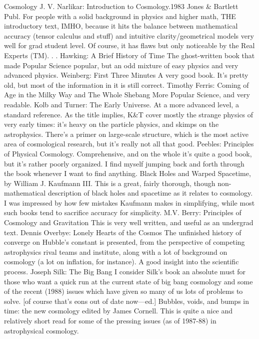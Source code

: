 \documentclass[10pt,a4paper]{book}
\theoremstyle{definition}
\begin{document}
Cosmology
J. V. Narlikar: Introduction to Cosmology.1983 Jones \& Bartlett Publ.
For people with a solid background in physics and higher math, THE introductory text, IMHO, because it hits the balance between mathematical accuracy (tensor calculus and stuff) and intuitive clarity/geometrical models very well for grad student level.  Of course, it has flaws but only noticeable by the Real Experts (TM). . .
Hawking: A Brief History of Time
The ghost-written book that made Popular Science popular, but an odd mixture of easy physics and very advanced physics.
Weinberg: First Three Minutes
A very good book.  It's pretty old, but most of the information in it is still correct.
Timothy Ferris: Coming of Age in the Milky Way and The Whole Shebang
More Popular Science, and very readable.
Kolb and Turner: The Early Universe.
At a more advanced level, a standard reference.  As the title implies, K\&T cover mostly the strange physics of very early times: it's heavy on the particle physics, and skimps on the astrophysics.  There's a primer on large-scale structure, which is the most active area of cosmological research, but it's really not all that good.
Peebles: Principles of Physical Cosmology. Comprehensive, and on the whole it's quite a good book, but it's rather poorly organized.  I find myself jumping back and forth through the book whenever I want to find anything.
Black Holes and Warped Spacetime, by William J. Kaufmann III.
This is a great, fairly thorough, though non-mathematical description of black holes and spacetime as it relates to cosmology.  I was impressed by how few mistakes Kaufmann makes in simplifying, while most such books tend to sacrifice accuracy for simplicity.
M.V. Berry: Principles of Cosmology and Gravitation
This is very well written, and useful as an undergrad text.
Dennis Overbye: Lonely Hearts of the Cosmos The unfinished history of converge on Hubble's constant is presented, from the perspective of competing astrophysics rival teams and institute, along with a lot of background on cosmology (a lot on inflation, for instance).  A good insight into the scientific process.
Joseph Silk: The Big Bang
I consider Silk's book an absolute must for those who want a quick run at the current state of big bang cosmology and some of the recent (1988) issues which have given so many of us lots of problems to solve.  [of course that's eons out of date now—ed.]
Bubbles, voids, and bumps in time: the new cosmology edited by James Cornell.
This is quite a nice and relatively short read for some of the pressing issues (as of 1987-88) in astrophysical cosmology.
\end{document}
